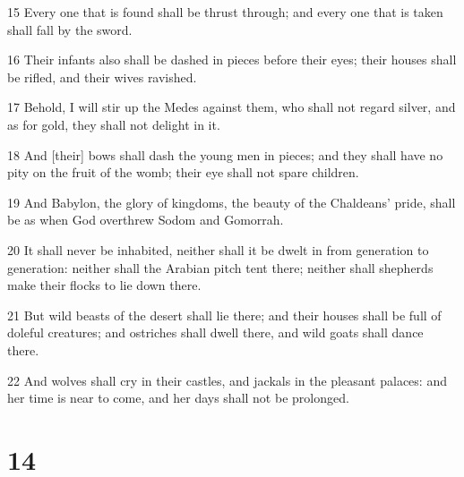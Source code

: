 \par 15 Every one that is found shall be thrust through; and every one that is taken shall fall by the sword.
\par 16 Their infants also shall be dashed in pieces before their eyes; their houses shall be rifled, and their wives ravished.
\par 17 Behold, I will stir up the Medes against them, who shall not regard silver, and as for gold, they shall not delight in it.
\par 18 And [their] bows shall dash the young men in pieces; and they shall have no pity on the fruit of the womb; their eye shall not spare children.
\par 19 And Babylon, the glory of kingdoms, the beauty of the Chaldeans' pride, shall be as when God overthrew Sodom and Gomorrah.
\par 20 It shall never be inhabited, neither shall it be dwelt in from generation to generation: neither shall the Arabian pitch tent there; neither shall shepherds make their flocks to lie down there.
\par 21 But wild beasts of the desert shall lie there; and their houses shall be full of doleful creatures; and ostriches shall dwell there, and wild goats shall dance there.
\par 22 And wolves shall cry in their castles, and jackals in the pleasant palaces: and her time is near to come, and her days shall not be prolonged.

\chapter{14}

